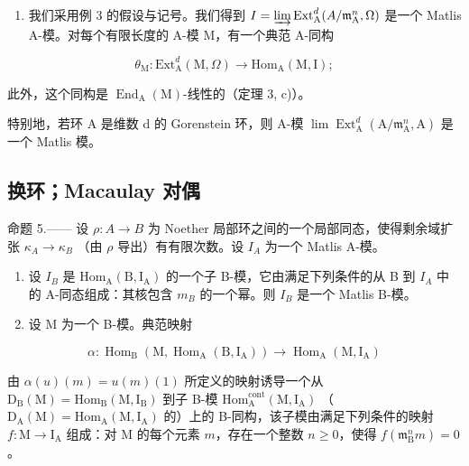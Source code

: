 \begin{enumerate}
\def\labelenumi{\arabic{enumi})}
\setcounter{enumi}{5}
\tightlist
\item
  我们采用例 3 的假设与记号。我们得到 \(I = \varinjlim \operatorname{Ext}_{\mathrm{A}}^{d}(A / \mathfrak{m}_{\mathrm{A}}^{n}, \Omega)\) 是一个 Matlis A-模。对每个有限长度的 A-模 M，有一个典范 A-同构
\end{enumerate}

\[
\theta_ {\mathrm{M}}: \mathrm{Ext} _ {\mathrm{A}} ^ {d} (\mathrm{M}, \Omega) \longrightarrow \mathrm{Hom} _ {\mathrm{A}} (\mathrm{M}, \mathrm{I});
\]

此外，这个同构是 \(\operatorname{End}_{\mathrm{A}}(\mathrm{M})\)-线性的（定理 3, c)）。

特别地，若环 A 是维数 d 的 Gorenstein 环，则 A-模 \(\lim\operatorname{Ext}_{\mathrm{A}}^{d}(\mathrm{A}/\mathfrak{m}_{\mathrm{A}}^{n},\mathrm{A})\) 是一个 Matlis 模。

\subsection{换环；Macaulay 对偶}

命题 5.—— 设 \(\rho: A \to B\) 为 Noether 局部环之间的一个局部同态，使得剩余域扩张 \(\kappa_A \to \kappa_B\) （由 \(\rho\) 导出）有有限次数。设 \(I_A\) 为一个 Matlis A-模。

\begin{enumerate}
\def\labelenumi{\alph{enumi})}
\item
  设 \(I_{B}\) 是 \(\mathrm{Hom}_{\mathrm{A}}(\mathrm{B},\mathrm{I}_{\mathrm{A}})\) 的一个子 B-模，它由满足下列条件的从 B 到 \(I_{A}\) 中的 A-同态组成：其核包含 \(m_{B}\) 的一个幂。则 \(I_{B}\) 是一个 Matlis B-模。
\item
  设 M 为一个 B-模。典范映射
\end{enumerate}

\[
\alpha : \operatorname{Hom} _ {\mathrm{B}} (\mathrm{M}, \operatorname{Hom} _ {\mathrm{A}} (\mathrm{B}, \mathrm{I} _ {\mathrm{A}})) \longrightarrow \operatorname{Hom} _ {\mathrm{A}} (\mathrm{M}, \mathrm{I} _ {\mathrm{A}})
\]

由 \(\alpha(u)(m)=u(m)(1)\) 所定义的映射诱导一个从 \(\mathrm{D}_{\mathrm{B}}(\mathrm{M})=\mathrm{Hom}_{\mathrm{B}}(\mathrm{M},\mathrm{I}_{\mathrm{B}})\) 到子 B-模 \(\mathrm{Hom}_{\mathrm{A}}^{\mathrm{cont}}(\mathrm{M},\mathrm{I}_{\mathrm{A}})\) （\(\mathrm{D}_{\mathrm{A}}(\mathrm{M})=\mathrm{Hom}_{\mathrm{A}}(\mathrm{M},\mathrm{I}_{\mathrm{A}})\) 的）上的 B-同构，该子模由满足下列条件的映射 \(f:\mathrm{M}\to\mathrm{I}_{\mathrm{A}}\) 组成：对 M 的每个元素 \(m\)，存在一个整数 \(n\geqslant0\)，使得 \(f(\mathfrak{m}_{\mathrm{B}}^{n}m)=0\)。


